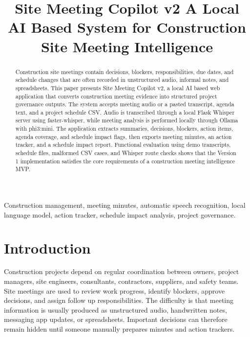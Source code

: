 \documentclass[conference]{IEEEtran}
\begin{document}
\title{Site Meeting Copilot v2 A Local AI Based System for Construction Site Meeting Intelligence}

\author{
}

\maketitle

\begin{abstract}
Construction site meetings contain decisions, blockers, responsibilities, due dates, and schedule changes that are often recorded in unstructured audio, informal notes, and spreadsheets. This paper presents Site Meeting Copilot v2, a local AI based web application that converts construction meeting evidence into structured project governance outputs. The system accepts meeting audio or a pasted transcript, agenda text, and a project schedule CSV. Audio is transcribed through a local Flask Whisper server using faster-whisper, while meeting analysis is performed locally through Ollama with phi3:mini. The application extracts summaries, decisions, blockers, action items, agenda coverage, and schedule impact flags, then exports meeting minutes, an action tracker, and a schedule impact report. Functional evaluation using demo transcripts, schedule files, malformed CSV cases, and Whisper route checks shows that the Version 1 implementation satisfies the core requirements of a construction meeting intelligence MVP.
\end{abstract}

\begin{IEEEkeywords}
Construction management, meeting minutes, automatic speech recognition, local language model, action tracker, schedule impact analysis, project governance.
\end{IEEEkeywords}

\section{Introduction}
Construction projects depend on regular coordination between owners, project managers, site engineers, consultants, contractors, suppliers, and safety teams. Site meetings are used to review work progress, identify blockers, approve decisions, and assign follow up responsibilities. The difficulty is that meeting information is usually produced as unstructured audio, handwritten notes, messaging app updates, or spreadsheets. Important decisions can therefore remain hidden until someone manually prepares minutes and action trackers.
\end{document}
